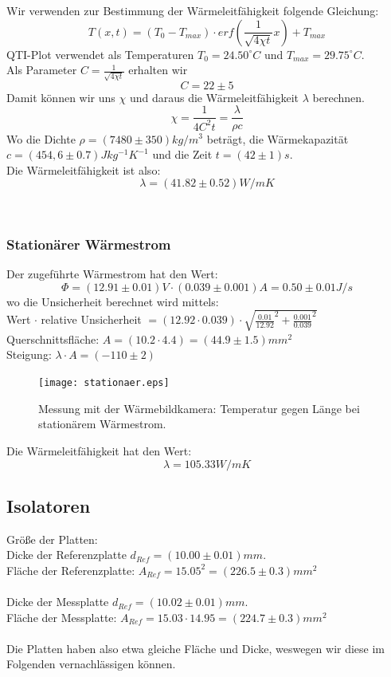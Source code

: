 \documentclass[12pt,a4paper,twopage]{article}
\begin{document}
Wir verwenden zur Bestimmung der Wärmeleitfähigkeit folgende Gleichung:
$$T(x,t)=(T_0 - T_{max}) \cdot erf\left(\frac{1}{\sqrt{4\chi t}}x\right) + T_{max}$$
QTI-Plot verwendet als Temperaturen $T_0=24.50^\circ C$ und $T_{max}=29.75^\circ C$.\\
Als Parameter $C=\frac{1}{\sqrt{4\chi t}}$ erhalten wir
$$C=22 \pm 5$$
Damit können wir uns $\chi$ und daraus die Wärmeleitfähigkeit $\lambda$ berechnen.
$$\chi = \frac{1}{4C^2 t}=\frac{\lambda}{\rho c}$$
Wo die Dichte $\rho = (7480 \pm 350)kg/m^3$ beträgt, die Wärmekapazität $c=(454,6 \pm 0.7)Jkg^{-1}K^{-1}$ und die Zeit $t=(42 \pm 1)s$.\\
Die Wärmeleitfähigkeit ist also:
$$\boxed{\lambda = (41.82 \pm 0.52)W/m K}$$

\\
\subsubsection{Stationärer Wärmestrom}
Der zugeführte Wärmestrom hat den Wert:
$$\Phi=(12.91 \pm 0.01)V \cdot (0.039 \pm 0.001)A=0.50 \pm 0.01 J/s$$
wo die Unsicherheit berechnet wird mittels:\\
Wert $\cdot$ relative Unsicherheit $= (12.92 \cdot 0.039) \cdot \sqrt{\frac{0.01}{12.92}^2 + \frac{0.001}{0.039}^2}$\\
Querschnittsfläche: $A=(10.2 \cdot 4.4)=(44.9 \pm 1.5)mm^2$\\
Steigung: $\lambda \cdot A = (-110 \pm 2)$\\
\begin{figure}[H]
\centering
\texttt{[image: stationaer.eps]}
\caption{Messung mit der Wärmebildkamera: Temperatur gegen Länge bei stationärem Wärmestrom.}
\end{figure}


Die Wärmeleitfähigkeit hat den Wert:
$$\boxed{\lambda=105.33 W/m K}$$

\subsection{Isolatoren}
Größe der Platten:\\
Dicke der Referenzplatte $d_{Ref}=(10.00 \pm 0.01)mm$.\\
Fläche der Referenzplatte: $A_{Ref}=15.05^2=(226.5 \pm 0.3)mm^2$\\
\\
Dicke der Messplatte $d_{Ref}=(10.02 \pm 0.01)mm$.\\
Fläche der Messplatte: $A_{Ref}=15.03 \cdot 14.95=(224.7 \pm 0.3)mm^2$\\
\\
Die Platten haben also etwa gleiche Fläche und Dicke, weswegen wir diese im Folgenden vernachlässigen können.\\
\end{document}
